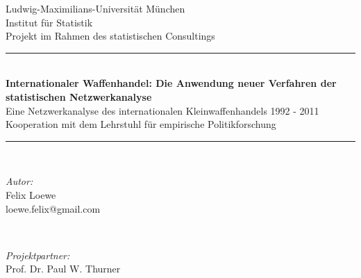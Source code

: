 \documentclass[a4paper,ngerman,oneside,titlepage,bibliography=totoc,11pt]{scrreprt}
\begin{document}
\begin{titlepage}

\newcommand{\HRule}{\rule{\linewidth}{0.5mm}} %

\center %
 

\LARGE Ludwig-Maximilians-Universität München\\[0.2cm] %
\LARGE Institut für Statistik\\[5mm]%
\large Projekt im Rahmen des statistischen Consultings\\[6mm]


\HRule \\[0.4cm]
{ \huge \bfseries Internationaler Waffenhandel:\vspace{-1.5mm} Die Anwendung neuer Verfahren der\\[1mm] statistischen Netzwerkanalyse}\\[5mm]
{ Eine Netzwerkanalyse des internationalen Kleinwaffenhandels 1992 - 2011}\\
{ Kooperation mit dem Lehrstuhl für empirische Politikforschung}\\[0.4cm] %
\HRule \\[1.5cm]
 

\begin{minipage}[t]{0.4\textwidth}
\begin{flushleft} \large
\emph{Autor:}\\[2mm]
Felix Loewe\\
loewe.felix@gmail.com\\[5mm]


\end{flushleft}
\end{minipage}
~
\begin{minipage}[t]{0.4\textwidth}
\begin{flushright} \large
\emph{Projektpartner:}\\[2mm]
Prof. Dr. Paul W. Thurner\\[6mm]


\end{flushright}
\end{minipage}
\end{titlepage}
\end{document}
